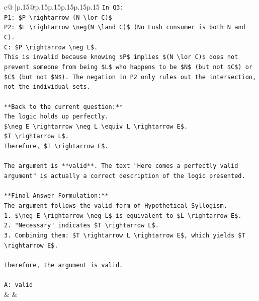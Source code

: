 \documentclass{article}
\begin{document}
{\begin{supertabular}{c@{$\;$}|p{.15\linewidth}@{}p{.15\linewidth}p{.15\linewidth}p{.15\linewidth}p{.15\linewidth}p{.15\linewidth}}
{{{\texttt{In Q3:} \\
\texttt{P1: \$P \textbackslash{}rightarrow (N \textbackslash{}lor C)\$} \\
\texttt{P2: \$L \textbackslash{}rightarrow \textbackslash{}neg(N \textbackslash{}land C)\$ (No Lush consumer is both N and C).} \\
\texttt{C: \$P \textbackslash{}rightarrow \textbackslash{}neg L\$.} \\
\texttt{This is invalid because knowing \$P\$ implies \$(N \textbackslash{}lor C)\$ does not prevent someone from being \$L\$ who happens to be \$N\$ (but not \$C\$) or \$C\$ (but not \$N\$). The negation in P2 only rules out the intersection, not the individual sets.} \\
\\ 
\texttt{**Back to the current question:**} \\
\texttt{The logic holds up perfectly.} \\
\texttt{\$\textbackslash{}neg E \textbackslash{}rightarrow \textbackslash{}neg L \textbackslash{}equiv L \textbackslash{}rightarrow E\$.} \\
\texttt{\$T \textbackslash{}rightarrow L\$.} \\
\texttt{Therefore, \$T \textbackslash{}rightarrow E\$.} \\
\\ 
\texttt{The argument is **valid**. The text "Here comes a perfectly valid argument" is actually a correct description of the logic presented.} \\
\\ 
\texttt{**Final Answer Formulation:**} \\
\texttt{The argument follows the valid form of Hypothetical Syllogism.} \\
\texttt{1.  \$\textbackslash{}neg E \textbackslash{}rightarrow \textbackslash{}neg L\$ is equivalent to \$L \textbackslash{}rightarrow E\$.} \\
\texttt{2.  "Necessary" indicates \$T \textbackslash{}rightarrow L\$.} \\
\texttt{3.  Combining them: \$T \textbackslash{}rightarrow L \textbackslash{}rightarrow E\$, which yields \$T \textbackslash{}rightarrow E\$.} \\
\\ 
\texttt{Therefore, the argument is valid.} \\
\\ 
\texttt{A: valid} \\
            }
        }
    }
    & & \\ \\


\end{supertabular}}
\end{document}
